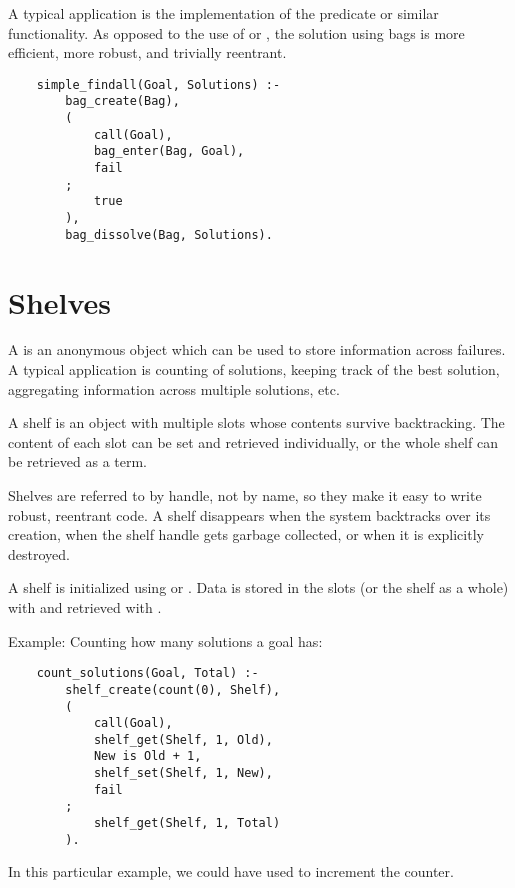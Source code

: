 A typical application is the
implementation of the  predicate or similar functionality.
As opposed to the use of  or , the
solution using
bags is more efficient, more robust, and trivially reentrant.
\begin{verbatim}
    simple_findall(Goal, Solutions) :-
        bag_create(Bag),
        (
            call(Goal),
            bag_enter(Bag, Goal),
            fail
        ;
            true
        ),
        bag_dissolve(Bag, Solutions).
\end{verbatim}


\section{Shelves}

A  is an anonymous object which can be used to store information
across failures.  A typical application is counting of solutions,
keeping track of the best solution, aggregating information across
multiple solutions, etc.

A shelf is an object with multiple slots whose contents survive
backtracking.  The content of each slot can be set and retrieved
individually, or the whole shelf can be retrieved as a term.

Shelves are referred to by handle, not by name, so they make it easy
to write robust, reentrant code.  A shelf disappears when the system
backtracks over its creation, when the shelf handle gets garbage
collected, or when it is explicitly destroyed.

A shelf is initialized using
 or
.
Data is stored in the slots (or the shelf as a whole) with
and retrieved with
.

Example: Counting how many solutions a goal has:
\begin{verbatim}
    count_solutions(Goal, Total) :-
        shelf_create(count(0), Shelf),
        (
            call(Goal),
            shelf_get(Shelf, 1, Old),
            New is Old + 1,
            shelf_set(Shelf, 1, New),
            fail
        ;
            shelf_get(Shelf, 1, Total)
        ).
\end{verbatim}
In this particular example, we could have used
 to
increment the counter.



